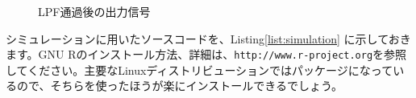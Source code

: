\begin{figure}
\begin{minipage}{0.5\hsize}
\caption{LPF通過後の出力信号} \label{fig:output}
\end{minipage}
\end{figure}

シミュレーションに用いたソースコードを、Listing\ref{list:simulation}
に示しておきます。GNU Rのインストール方法、詳細は、\texttt{http://www.r-project.org}を参照してください。主要なLinuxディストリビューションではパッケージになっているので、そちらを使ったほうが楽にインストールできるでしょう。


\lstset{language=R,basicstyle=\ttfamily,numbers=left}

